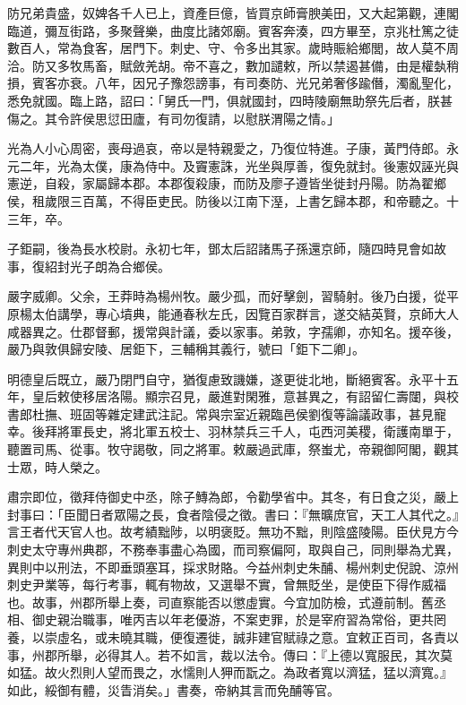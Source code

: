\begin{pinyinscope}
防兄弟貴盛，奴婢各千人已上，資產巨億，皆買京師膏腴美田，又大起第觀，連閣臨道，彌亙街路，多聚聲樂，曲度比諸郊廟。賓客奔湊，四方畢至，京兆杜篤之徒數百人，常為食客，居門下。刺史、守、令多出其家。歲時賑給鄉閭，故人莫不周洽。防又多牧馬畜，賦斂羌胡。帝不喜之，數加譴敕，所以禁遏甚備，由是權埶稍損，賓客亦衰。八年，因兄子豫怨謗事，有司奏防、光兄弟奢侈踰僭，濁亂聖化，悉免就國。臨上路，詔曰：「舅氏一門，俱就國封，四時陵廟無助祭先后者，朕甚傷之。其令許侯思愆田廬，有司勿復請，以慰朕渭陽之情。」

光為人小心周密，喪母過哀，帝以是特親愛之，乃復位特進。子康，黃門侍郎。永元二年，光為太僕，康為侍中。及竇憲誅，光坐與厚善，復免就封。後憲奴誣光與憲逆，自殺，家屬歸本郡。本郡復殺康，而防及廖子遵皆坐徙封丹陽。防為翟鄉侯，租歲限三百萬，不得臣吏民。防後以江南下溼，上書乞歸本郡，和帝聽之。十三年，卒。

子鉅嗣，後為長水校尉。永初七年，鄧太后詔諸馬子孫還京師，隨四時見會如故事，復紹封光子朗為合鄉侯。

嚴字威卿。父余，王莽時為楊州牧。嚴少孤，而好擊劍，習騎射。後乃白援，從平原楊太伯講學，專心墳典，能通春秋左氏，因覽百家群言，遂交結英賢，京師大人咸器異之。仕郡督郵，援常與計議，委以家事。弟敦，字孺卿，亦知名。援卒後，嚴乃與敦俱歸安陵、居鉅下，三輔稱其義行，號曰「鉅下二卿」。

明德皇后既立，嚴乃閉門自守，猶復慮致譏嫌，遂更徙北地，斷絕賓客。永平十五年，皇后敕使移居洛陽。顯宗召見，嚴進對閑雅，意甚異之，有詔留仁壽闥，與校書郎杜撫、班固等雜定建武注記。常與宗室近親臨邑侯劉復等論議政事，甚見寵幸。後拜將軍長史，將北軍五校士、羽林禁兵三千人，屯西河美稷，衛護南單于，聽置司馬、從事。牧守謁敬，同之將軍。敕嚴過武庫，祭蚩尤，帝親御阿閣，觀其士眾，時人榮之。

肅宗即位，徵拜侍御史中丞，除子鱄為郎，令勸學省中。其冬，有日食之災，嚴上封事曰：「臣聞日者眾陽之長，食者陰侵之徵。書曰：『無曠庶官，天工人其代之。』言王者代天官人也。故考績黜陟，以明褒貶。無功不黜，則陰盛陵陽。臣伏見方今刺史太守專州典郡，不務奉事盡心為國，而司察偏阿，取與自己，同則舉為尤異，異則中以刑法，不即垂頭塞耳，採求財賂。今益州刺史朱酺、楊州刺史倪說、涼州刺史尹業等，每行考事，輒有物故，又選舉不實，曾無貶坐，是使臣下得作威福也。故事，州郡所舉上奏，司直察能否以懲虛實。今宜加防檢，式遵前制。舊丞相、御史親治職事，唯丙吉以年老優游，不案吏罪，於是宰府習為常俗，更共罔養，以崇虛名，或未曉其職，便復遷徙，誠非建官賦祿之意。宜敕正百司，各責以事，州郡所舉，必得其人。若不如言，裁以法令。傳曰：『上德以寬服民，其次莫如猛。故火烈則人望而畏之，水懦則人狎而翫之。為政者寬以濟猛，猛以濟寬。』如此，綏御有體，災眚消矣。」書奏，帝納其言而免酺等官。


\end{pinyinscope}
